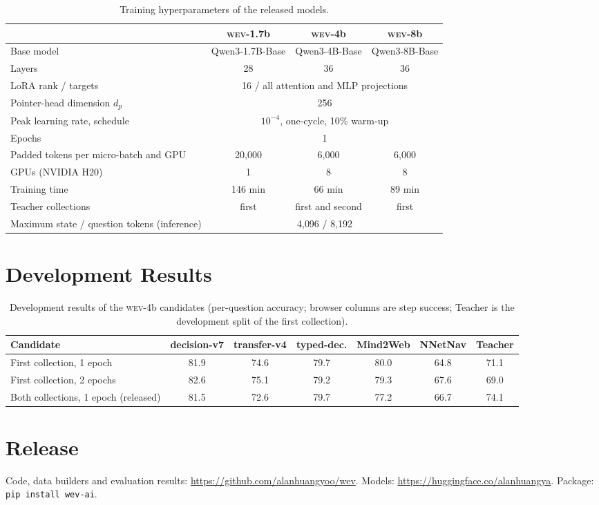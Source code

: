 \documentclass{article}
\newcommand{\wev}{\textsc{wev}\xspace}
\begin{document}
\begin{table}[h]
\centering
\caption{Training hyperparameters of the released models.}
\small
\begin{tabular}{lccc}
\toprule
 & \wev-1.7b & \wev-4b & \wev-8b \\
\midrule
Base model & Qwen3-1.7B-Base & Qwen3-4B-Base & Qwen3-8B-Base \\
Layers & 28 & 36 & 36 \\
LoRA rank / targets & \multicolumn{3}{c}{16 / all attention and MLP projections} \\
Pointer-head dimension $d_p$ & \multicolumn{3}{c}{256} \\
Peak learning rate, schedule & \multicolumn{3}{c}{$10^{-4}$, one-cycle, 10\% warm-up} \\
Epochs & \multicolumn{3}{c}{1} \\
Padded tokens per micro-batch and GPU & 20{,}000 & 6{,}000 & 6{,}000 \\
GPUs (NVIDIA H20) & 1 & 8 & 8 \\
Training time & 146 min & 66 min & 89 min \\
Teacher collections & first & first and second & first \\
Maximum state / question tokens (inference) & \multicolumn{3}{c}{4{,}096 / 8{,}192} \\
\bottomrule
\end{tabular}
\end{table}

\section{Development Results}
\label{app:dev}

\begin{table}[h]
\centering
\caption{Development results of the \wev-4b candidates (per-question accuracy; browser columns are step success;
Teacher is the development split of the first collection).}
\small
\begin{tabular}{lcccccc}
\toprule
Candidate & decision-v7 & transfer-v4 & typed-dec. & Mind2Web & NNetNav & Teacher \\
\midrule
First collection, 1 epoch & 81.9 & 74.6 & 79.7 & 80.0 & 64.8 & 71.1 \\
First collection, 2 epochs & 82.6 & 75.1 & 79.2 & 79.3 & 67.6 & 69.0 \\
Both collections, 1 epoch (released) & 81.5 & 72.6 & 79.7 & 77.2 & 66.7 & 74.1 \\
\bottomrule
\end{tabular}
\end{table}

\section{Release}
\label{app:release}

Code, data builders and evaluation results: \url{https://github.com/alanhuangyoo/wev}. Models:
\url{https://huggingface.co/alanhuangya}. Package: \texttt{pip install wev-ai}.
\end{document}
